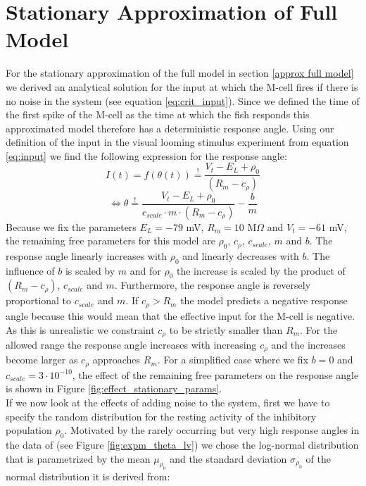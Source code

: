 	\section{Stationary Approximation of Full Model}
    For the stationary approximation of the full model in section \ref{approx full model} we derived an analytical solution for the input at which the M-cell fires if there is no noise in the system (see equation \ref{eq:crit_input}).
    Since we defined the time of the first spike of the M-cell as the time at which the fish responds this approximated model therefore has a deterministic response angle.
    Using our definition of the input in the visual looming stimulus experiment from equation \ref{eq:input} we find the following expression for the response angle:
    \begin{equation}
	I(t) = f(\theta(t)) \overset{!}{=} \frac{V_t - E_{L} + \rho_{0}}{(R_{m} - c_{\rho})}
	\label{eq:crit_theta_start}
	\end{equation}
    \begin{equation}
	\Leftrightarrow \theta \overset{!}{=} \frac{V_t - E_{L} + \rho_{0}}{c_{scale}\cdot m \cdot (R_{m} - c_{\rho})} - \frac{b}{m}
	\label{eq:crit_theta_end}
	\end{equation}
	Because we fix the parameters $E_{L}=-79$ mV, $R_{m}=10$ M$\Omega$ and $V_{t}=-61$ mV, the remaining free parameters for this model are $\rho_{0}$, $c_{\rho}$, $c_{scale}$, $m$ and $b$.
    The response angle linearly increases with $\rho_{0}$ and linearly decreases with $b$.
    The influence of $b$ is scaled by $m$ and for $\rho_{0}$ the increase is scaled by the product of $(R_{m} - c_{\rho})$, $c_{scale}$ and $m$.
    Furthermore, the response angle is reversely proportional to $c_{scale}$ and $m$.
    If $c_{\rho} > R_{m}$ the model predicts a negative response angle because this would mean that the effective input for the M-cell is negative.
    As this is unrealistic we constraint $c_{\rho}$ to be strictly smaller than $R_{m}$.
    For the allowed range the response angle increases with increasing $c_{\rho}$ and the increases become larger as $c_{\rho}$ approaches $R_{m}$.
    For a simplified case where we fix $b=0$ and $c_{scale}=3\cdot10^{-10}$, the effect of the remaining free parameters on the response angle is shown in Figure \ref{fig:effect_stationary_params}.\\
    If we now look at the effects of adding noise to the system, first we have to specify the random distribution for the resting activity of the inhibitory population $\rho_0$.
    Motivated by the rarely occurring but very high response angles in the data of \cite{Bhattacharyya2017} (see Figure \ref{fig:expm_theta_lv}) we chose the log-normal distribution that is parametrized by the mean $\mu_{\rho_{0}}$ and the standard deviation $\sigma_{\rho_{0}}$ of the normal distribution it is derived from:
